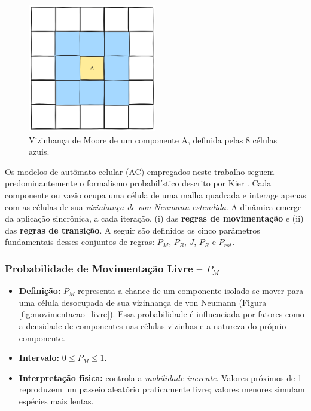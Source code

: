 \documentclass[12pt,oneside]{report}
\begin{document}
\begin{figure}[H]
    \centering
    \includegraphics[width=0.5\textwidth]{img/vizinhanca_moore.png}
    \caption{\small Vizinhança de Moore de um componente A, definida pelas 8 células azuis.}
    \label{fig:vizinhanca_moore}
\end{figure}

Os modelos de autômato celular (AC) empregados neste trabalho seguem predominantemente o formalismo probabilístico descrito por Kier \cite{kier2005}. Cada componente ou vazio ocupa uma célula de uma malha quadrada e interage apenas com as células de sua \textit{vizinhança de von Neumann estendida}. A dinâmica emerge da aplicação sincrônica, a cada iteração, (i) das \textbf{regras de movimentação} e (ii) das \textbf{regras de transição}. A seguir são definidos os cinco parâmetros fundamentais desses conjuntos de regras: $P_M$, $P_B$, $J$, $P_R$ e $P_{rot}$.

\subsubsection{Probabilidade de Movimentação Livre – \texorpdfstring{$P_M$}{Pm}}
\label{subsubsec:Pm}

\begin{itemize}
    \item \textbf{Definição:} $P_M$ representa a chance de um componente isolado se mover para uma célula desocupada de sua vizinhança de von Neumann (Figura \ref{fig:movimentacao_livre}). Essa probabilidade é influenciada por fatores como a densidade de componentes nas células vizinhas e a natureza do próprio componente.
    \item \textbf{Intervalo:} $0 \le P_M \le 1$.
    \item \textbf{Interpretação física:} controla a \textit{mobilidade inerente}.
          Valores próximos de 1 reproduzem um passeio aleatório praticamente livre; valores
          menores simulam espécies mais lentas.
\end{itemize}
\end{document}
